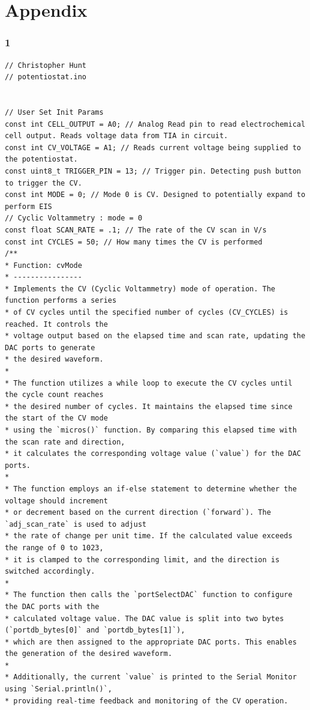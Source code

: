 \documentclass{article}
\begin{document}
\section*{Appendix}
\subsubsection*{1}
\begin{lstlisting}
// Christopher Hunt
// potentiostat.ino


// User Set Init Params
const int CELL_OUTPUT = A0; // Analog Read pin to read electrochemical cell output. Reads voltage data from TIA in circuit.
const int CV_VOLTAGE = A1; // Reads current voltage being supplied to the potentiostat.
const uint8_t TRIGGER_PIN = 13; // Trigger pin. Detecting push button to trigger the CV.
const int MODE = 0; // Mode 0 is CV. Designed to potentially expand to perform EIS
// Cyclic Voltammetry : mode = 0
const float SCAN_RATE = .1; // The rate of the CV scan in V/s
const int CYCLES = 50; // How many times the CV is performed
/**
* Function: cvMode
* ----------------
* Implements the CV (Cyclic Voltammetry) mode of operation. The function performs a series
* of CV cycles until the specified number of cycles (CV_CYCLES) is reached. It controls the
* voltage output based on the elapsed time and scan rate, updating the DAC ports to generate
* the desired waveform.
*
* The function utilizes a while loop to execute the CV cycles until the cycle count reaches
* the desired number of cycles. It maintains the elapsed time since the start of the CV mode
* using the `micros()` function. By comparing this elapsed time with the scan rate and direction,
* it calculates the corresponding voltage value (`value`) for the DAC ports.
*
* The function employs an if-else statement to determine whether the voltage should increment
* or decrement based on the current direction (`forward`). The `adj_scan_rate` is used to adjust
* the rate of change per unit time. If the calculated value exceeds the range of 0 to 1023,
* it is clamped to the corresponding limit, and the direction is switched accordingly.
*
* The function then calls the `portSelectDAC` function to configure the DAC ports with the
* calculated voltage value. The DAC value is split into two bytes (`portdb_bytes[0]` and `portdb_bytes[1]`),
* which are then assigned to the appropriate DAC ports. This enables the generation of the desired waveform.
*
* Additionally, the current `value` is printed to the Serial Monitor using `Serial.println()`,
* providing real-time feedback and monitoring of the CV operation.

\end{lstlisting}
\end{document}
